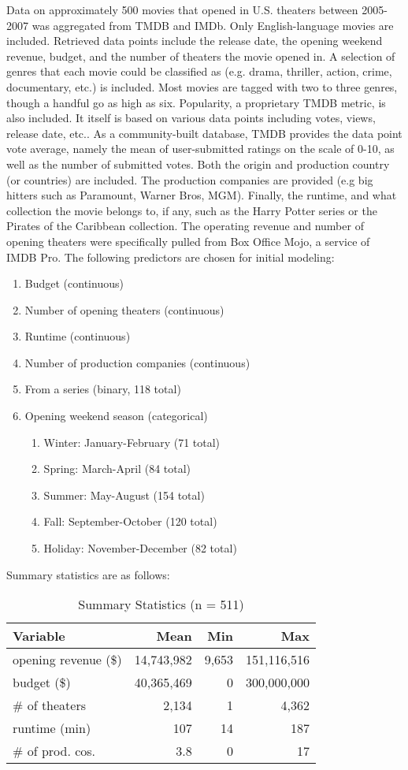 \documentclass[10pt]{article}
\begin{document}
Data on approximately 500 movies that opened in U.S. theaters between 2005-2007 was aggregated from TMDB and IMDb. Only English-language movies are included. Retrieved data points include the release date, the opening weekend revenue, budget, and the number of theaters the movie opened in. A selection of genres that each movie could be classified as (e.g. drama, thriller, action, crime, documentary, etc.) is included. Most movies are tagged with two to three genres, though a handful go as high as six. Popularity, a proprietary TMDB metric, is also included. It itself is based on various data points including votes, views, release date, etc.. As a community-built database, TMDB provides the data point vote average, namely the mean of user-submitted ratings on the scale of 0-10, as well as the number of submitted votes.  Both the origin and production country (or countries) are included. The production companies are provided (e.g big hitters such as Paramount, Warner Bros, MGM). Finally, the runtime, and what collection the movie belongs to, if any, such as the Harry Potter series or the Pirates of the Caribbean collection. The operating revenue and number of opening theaters were specifically pulled from Box Office Mojo, a service of IMDB Pro. The following predictors are chosen for initial modeling:
\begin{enumerate}
\item Budget (continuous)
\item Number of opening theaters (continuous)
\item Runtime (continuous)
\item Number of production companies (continuous)
\item From a series (binary, 118 total)
\item Opening weekend season (categorical)
\begin{enumerate}
\item Winter: January-February (71 total)
\item Spring: March-April (84 total)
\item Summer: May-August (154 total)
\item Fall: September-October (120 total)
\item Holiday: November-December (82 total)
\end{enumerate}
\end{enumerate}

Summary statistics are as follows:
\begin{table}[H]
\centering
\caption{Summary Statistics (n = 511)}
\begin{tabular}{|lrrr|} 
\hline
Variable & Mean & Min & Max \\ 
\hline
opening revenue (\$) & 14,743,982 & 9,653 & 151,116,516\\
\hline
budget (\$) & 40,365,469 & 0 & 300,000,000\\
\hline
\# of theaters & 2,134 & 1 & 4,362\\
\hline
runtime (min) & 107 & 14 & 187\\
\hline
\# of prod. cos. & 3.8 & 0 & 17\\
\hline
\end{tabular}  
\end{table}
\end{document}
